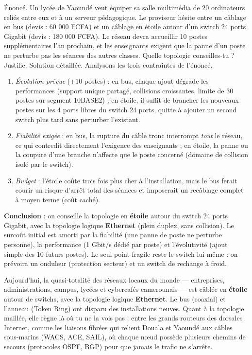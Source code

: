 \documentclass[11pt]{article}
\begin{document}
\begin{exoresolu}
Énoncé. Un lycée de Yaoundé veut équiper sa salle multimédia de 20 ordinateurs reliés entre eux et à un serveur pédagogique. Le proviseur hésite entre un câblage en bus (devis : 60 000 FCFA) et un câblage en étoile autour d'un switch 24 ports Gigabit (devis : 180 000 FCFA). Le réseau devra accueillir 10 postes supplémentaires l'an prochain, et les enseignants exigent que la panne d'un poste ne perturbe pas les séances des autres classes. Quelle topologie conseilles-tu ? Justifie.
\tcblower
Solution détaillée. Analysons les trois contraintes de l'énoncé.
\begin{enumerate}
\item \emph{Évolution prévue} (+10 postes) : en bus, chaque ajout dégrade les performances (support unique partagé, collisions croissantes, limite de 30 postes sur segment 10BASE2) ; en étoile, il suffit de brancher les nouveaux postes sur les 4 ports libres du switch 24 ports, quitte à ajouter un second switch plus tard sans perturber l'existant.
\item \emph{Fiabilité exigée} : en bus, la rupture du câble tronc interrompt \emph{tout} le réseau, ce qui contredit directement l'exigence des enseignants ; en étoile, la panne ou la coupure d'une branche n'affecte que le poste concerné (domaine de collision isolé par le switch).
\item \emph{Budget} : l'étoile coûte trois fois plus cher à l'installation, mais le bus ferait courir un risque d'arrêt total des séances et imposerait un recâblage complet à moyen terme (coût caché).
\end{enumerate}
\textbf{Conclusion} : on conseille la topologie en \textbf{étoile} autour du switch 24 ports Gigabit, avec la topologie logique \textbf{Ethernet} (plein duplex, sans collision). Le surcoût initial est amorti par la fiabilité (une panne de poste ne perturbe personne), la performance (1 Gbit/s dédié par poste) et l'évolutivité (ajout simple des 10 futurs postes). Le seul point fragile reste le switch lui-même : on prévoira un onduleur (protection secteur) et un switch de rechange à froid.
\end{exoresolu}

\begin{savaistu}
Aujourd'hui, la quasi-totalité des réseaux locaux du monde — entreprises, administrations, campus, lycées et cybercafés camerounais — est câblée en \textbf{étoile} autour de switchs, avec la topologie logique \textbf{Ethernet}. Le bus (coaxial) et l'anneau (Token Ring) ont disparu des installations neuves. Quant à la topologie maillée, elle règne là où tu ne la vois pas : entre les grands routeurs des dorsales Internet, comme les liaisons fibrées qui relient Douala et Yaoundé aux câbles sous-marins (WACS, ACE, SAIL), où chaque nœud possède plusieurs chemins de secours (protocoles OSPF, BGP) pour que jamais le trafic ne s'arrête.
\end{savaistu}
\end{document}
